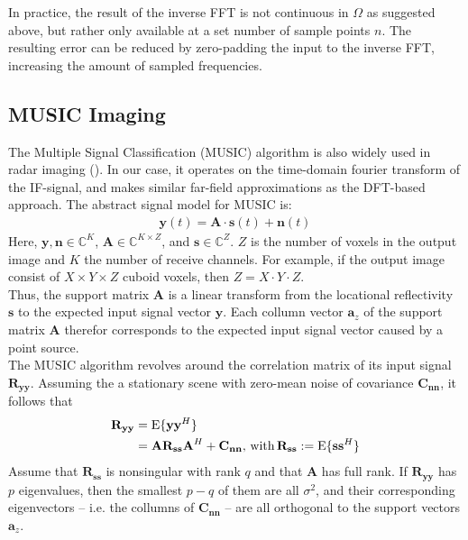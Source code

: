 In practice, the result of the inverse FFT is not continuous in $\Omega$ as suggested above,
but rather only available at a set number of sample points $n$.
The resulting error can be reduced by zero-padding the input to the inverse FFT,
increasing the amount of sampled frequencies.

\subsection{MUSIC Imaging}
The Multiple Signal Classification (MUSIC) algorithm \cite{music} is also widely used in radar imaging ().
In our case, it operates on the time-domain fourier transform of the IF-signal,
and makes similar far-field approximations as the DFT-based approach.
The abstract signal model for MUSIC is:
\begin{align}
    \mathbf y(t) = \mathbf A \cdot \mathbf s(t) + \mathbf n(t)
\end{align}
Here, $\mathbf y,\mathbf n \in \mathbb{C}^{K}$,
$\mathbf A \in \mathbb{C}^{K \times Z}$, and
$\mathbf s \in \mathbb{C}^{Z}$.
$Z$ is the number of voxels in the output image and $K$ the number of receive channels.
For example, if the output image consist of $X \times Y \times Z$ cuboid voxels, then $Z=X\cdot Y\cdot Z$. \\
Thus, the support matrix $\mathbf A$ is a linear transform from the locational reflectivity $\mathbf{s}$
to the expected input signal vector $\mathbf{y}$.
Each collumn vector $\mathbf a_z$ of the support matrix $\mathbf A$ therefor corresponds to the expected input signal vector caused by a point source. \\

The MUSIC algorithm revolves around the correlation matrix of its input signal $\mathbf{R_{yy}}$.
Assuming the a stationary scene with zero-mean noise of covariance $\mathbf{C_{nn}}$,
it follows that
\begin{align}
    \mathbf{R_{yy}} & = \text{E}\{\mathbf{yy}^H\}             \\
                    & =\mathbf{AR_{ss}A}^H + \mathbf{C_{nn}},
    \text{\,with\,} \mathbf{R_{ss}} := \text{E}\{\mathbf{ss}^H\}
\end{align}
Assume that $\mathbf{R_{ss}}$ is nonsingular with rank $q$ and that $\mathbf{A}$ has full rank.
If $\mathbf{R_{yy}}$ has $p$ eigenvalues, then the smallest $p-q$ of them are all $\sigma^2$,
and their corresponding eigenvectors -- i.e. the collumns of $\mathbf{C_{nn}}$ -- are all orthogonal to the support vectors $\mathbf a_z$.

